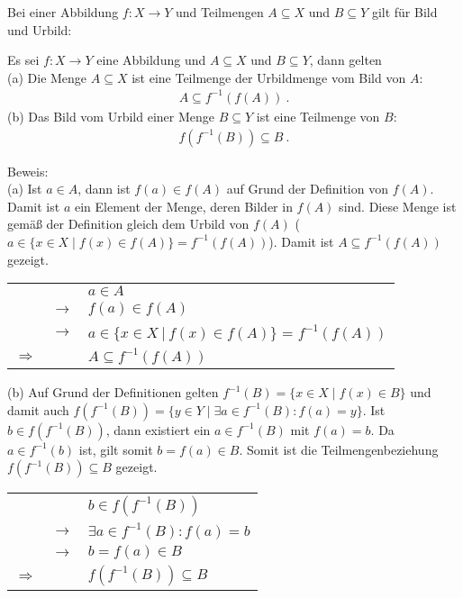 \begin{Unit}[Bemerkung]
\label{bem:Abbildungen und Teilmengen}

Bei einer Abbildung $f: X \rightarrow Y$ und Teilmengen $A \subseteq X$ und 
$B \subseteq Y$ gilt für Bild und Urbild:

\begin{Bemerkung}
  Es sei $f: X \rightarrow Y$ eine Abbildung und $A \subseteq X$ und $B 
  \subseteq Y$, dann gelten \\
  (a) Die Menge $A \subseteq X$ ist eine Teilmenge der Urbildmenge vom Bild 
    von $A$:
    \begin{align}
      A \subseteq f^{-1}(f(A)) \ .
    \end{align}
  (b) Das Bild vom Urbild einer Menge $B \subseteq Y$ ist eine Teilmenge von 
    $B$:
    \begin{align}
      f(f^{-1}(B)) \subseteq B \ .
    \end{align}
\end{Bemerkung}

Beweis: \\
(a) Ist $a \in A$, dann ist $f(a) \in f(A)$ auf Grund der Definition von 
$f(A)$. Damit ist $a$ ein Element der Menge, deren Bilder in $f(A)$ sind. 
Diese Menge ist gemäß der Definition gleich dem Urbild von $f(A)$ 
($a \in \{x \in X \mid f(x) \in f(A)\} = f^{-1}(f(A))$). Damit ist 
$A \subseteq f^{-1}(f(A))$ gezeigt.

\begin{tabular}{l l l}
  & &  $a \in A$ \\
  & $\rightarrow$ &  $f(a) \in f(A)$\\
  & $\rightarrow$ & $a \in \{x \in X\ |\ f(x) \in f(A)\}$ = $f^{-1}(f(A))$ \\
  $\Rightarrow$ & & $A \subseteq f^{-1}(f(A))$\\
\end{tabular}

(b) Auf Grund der Definitionen gelten $f^{-1}(B) = \{x \in X \mid f(x) 
\in B\}$ und damit auch $f(f^{-1}(B)) = \{y \in Y \mid \exists a 
\in f^{-1}(B): f(a) = y\}$. Ist $b \in f(f^{-1}(B))$, dann existiert ein 
$a \in f^{-1}(B)$ mit $f(a) = b$. Da $a \in f^{-1}(b)$ ist, gilt somit 
$b = f(a) \in B$. Somit ist die Teilmengenbeziehung 
$f(f^{-1}(B)) \subseteq B$ gezeigt.

\begin{tabular}{l l l}
  & & $b \in f(f^{-1}(B))$ \\
  & $\rightarrow$ & $\exists a \in f^{-1}(B): f(a) = b$ \\
  & $\rightarrow$ & $b = f(a) \in B$ \\
  $\Rightarrow$ & & $f(f^{-1}(B)) \subseteq B$ \\
\end{tabular} 
\end{Unit}

